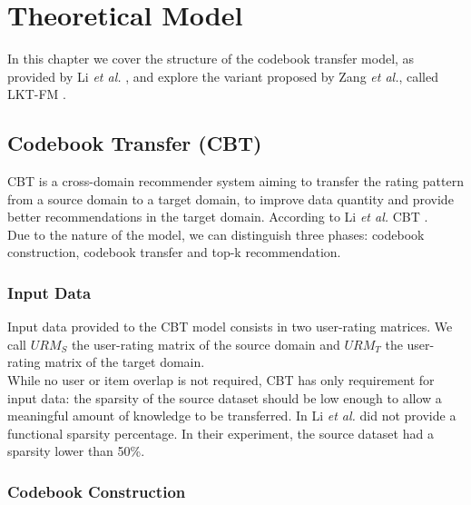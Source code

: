 \chapter{Theoretical Model}
\label{ch:theoretical-model}

In this chapter we cover the structure of the codebook transfer model, as provided by Li \textit{et al.} \cite{10.5555/1661445.1661773}, and explore the variant proposed by Zang \textit{et al.}, called LKT-FM \cite{10.1007/978-3-319-71246-8_39}.


\section{Codebook Transfer (CBT)}

CBT is a cross-domain recommender system aiming to transfer the rating pattern from a source domain to a target domain, to improve data quantity and provide better recommendations in the target domain. According to Li \textit{et al.} \cite{10.5555/1661445.1661773} CBT .\\
Due to the nature of the model, we can distinguish three phases: codebook construction, codebook transfer and top-k recommendation.


\subsection{Input Data}

Input data provided to the CBT model consists in two user-rating matrices. We call $URM_S$ the user-rating matrix of the source domain and $URM_T$ the user-rating matrix of the target domain.\\
While no user or item overlap is not required, CBT has only requirement for input data: the sparsity of the source dataset should be low enough to allow a meaningful amount of knowledge to be transferred. In \cite{10.5555/1661445.1661773} Li \textit{et al.} did not provide a functional sparsity percentage. In their experiment, the source dataset had a sparsity lower than 50\%.


\subsection{Codebook Construction}

